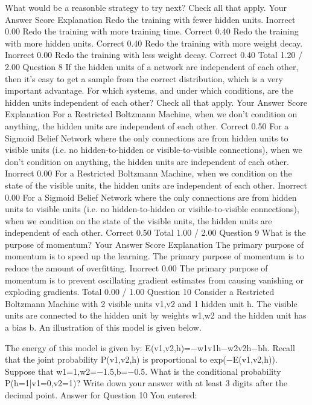 What would be a reasonble strategy to try next? Check all that apply.
Your Answer		Score	Explanation
Redo the training with fewer hidden units.	Inorrect	0.00	
Redo the training with more training time.	Correct	0.40	
Redo the training with more hidden units.	Correct	0.40	
Redo the training with more weight decay.	Inorrect	0.00	
Redo the training with less weight decay.	Correct	0.40	
Total		1.20 / 2.00	
Question 8
If the hidden units of a network are independent of each other, then it's easy to get a sample from the correct distribution, which is a very important advantage. For which systems, and under which conditions, are the hidden units independent of each other? Check all that apply.
Your Answer		Score	Explanation
For a Restricted Boltzmann Machine, when we don't condition on anything, the hidden units are independent of each other.	Correct	0.50	
For a Sigmoid Belief Network where the only connections are from hidden units to visible units (i.e. no hidden-to-hidden or visible-to-visible connections), when we don't condition on anything, the hidden units are independent of each other.	Inorrect	0.00	
For a Restricted Boltzmann Machine, when we condition on the state of the visible units, the hidden units are independent of each other.	Inorrect	0.00	
For a Sigmoid Belief Network where the only connections are from hidden units to visible units (i.e. no hidden-to-hidden or visible-to-visible connections), when we condition on the state of the visible units, the hidden units are independent of each other.	Correct	0.50	
Total		1.00 / 2.00	
Question 9
What is the purpose of momentum?
Your Answer		Score	Explanation
The primary purpose of momentum is to speed up the learning.			
The primary purpose of momentum is to reduce the amount of overfitting.	Inorrect	0.00	
The primary purpose of momentum is to prevent oscillating gradient estimates from causing vanishing or exploding gradients.			
Total		0.00 / 1.00	
Question 10
Consider a Restricted Boltzmann Machine with 2 visible units v1,v2 and 1 hidden unit h. The visible units are connected to the hidden unit by weights w1,w2 and the hidden unit has a bias b. An illustration of this model is given below.

The energy of this model is given by: E(v1,v2,h)=−w1v1h−w2v2h−bh. Recall that the joint probability P(v1,v2,h) is proportional to exp(−E(v1,v2,h)).
Suppose that w1=1,w2=−1.5,b=−0.5. What is the conditional probability P(h=1|v1=0,v2=1)? Write down your answer with at least 3 digits after the decimal point.
Answer for Question 10
You entered:

